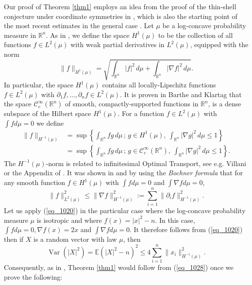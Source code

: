 \documentclass[12pt,a4paper]{article}
\newcommand{\EE}{\mathbb{E}}
\newcommand{\RR}{\mathbb{R}}
\newcommand{\var}{\mathop{\mathrm{Var}}\nolimits}
\theoremstyle{definition}
\begin{document}
\medskip Our proof of Theorem \ref{thm1} employs an idea from the proof of the thin-shell conjecture under coordinate symmetries in \cite{K_ptrf}, which is 
also the starting point of the most recent estimates in the 
general case \cite{KL,JLV,guan}. 
Let $\mu$ be a log-concave probability measure in $\RR^n$. As in \cite{barthe_klartag}, we define the space $H^1(\mu)$ to be the collection of all functions $f \in L^2(\mu)$ with weak partial derivatives in $L^2(\mu)$,  equipped with the norm
$$ \| f \|_{H^1(\mu)} = \sqrt{ \int_{\RR^n} |f|^2 \, d \mu + \int_{\RR^n} |\nabla f|^2 \, d \mu}. $$
In particular, the space $H^1(\mu)$ contains all locally-Lipschitz functions $f \in L^2(\mu)$ with $\partial_1 f, \ldots, \partial_n f \in L^2(\mu)$.
It is proven in Barthe and Klartag \cite{barthe_klartag} that the space $\mathcal C_c^{\infty}(\RR^n)$ of smooth, compactly-supported functions in $\RR^n$, is a dense subspace of the Hilbert space $H^1(\mu)$.
For a function $f \in L^2(\mu)$ with $\int f d \mu = 0$ we define
\begin{align}
	\nonumber
	\| f \|_{H^{-1}(\mu)}
& = 	\sup \left \{ \int_{\RR^n} f g \, d \mu \, ; \, g \in H^1(\mu), \ \int_{\RR^n} |\nabla g|^2 \, d \mu \leq 1 \right \}
	\\ &= \sup \left \{ \int_{\RR^n} f g \, d \mu \, ; \, g \in \mathcal C_c^{\infty}(\RR^n), \ \int_{\RR^n} |\nabla g|^2 \, d \mu \leq 1 \right \}.
	\label{eq_1528}
\end{align}
The $H^{-1}(\mu)$-norm is related to infinitesimal Optimal Transport, see e.g. Villani \cite[Section 7.6]{Vil} or the Appendix of \cite{K_ptrf}.
It was shown
in \cite{barthe_klartag} and \cite{K_ptrf}
by using the {\it Bochner formula} that
 for any smooth function $f \in H^1(\mu)$ with $\int f d \mu = 0$ and $\int \nabla f d \mu = 0$,
\begin{equation}
\| f \|_{L^2(\mu)}^2 \leq \| \nabla f \|_{H^{-1}(\mu)}^2 :=
\sum_{i=1}^n \| \partial_i f \|_{H^{-1}(\mu)}^2. \label{eq_1020}
\end{equation}
Let us apply (\ref{eq_1020}) in the particular case where the log-concave probability measure $\mu$ is isotropic
and where $f(x) = |x|^2 - n$. In this case, $\int f d \mu = 0, \nabla f(x) = 2x$ and $\int \nabla f d \mu = 0$.
 It therefore follows from (\ref{eq_1020}) then if $X$ is a random vector with law $\mu$, then
\begin{equation}
\var(|X|^2) = \EE (|X|^2 - n)^2 \leq 4 \sum_{i=1}^n \| x_i \|^2_{H^{-1}(\mu)}. \label{eq_1028}
\end{equation}
Consequently, as in \cite{K_ptrf}, Theorem \ref{thm1} would follow from (\ref{eq_1028}) once we prove the following:
\end{document}
